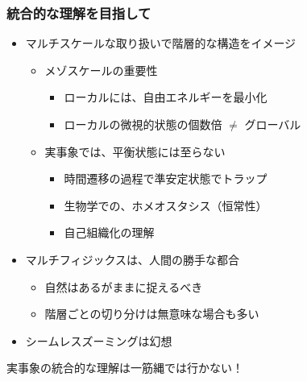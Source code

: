 \documentclass[12pt, dvipdfmx]{beamer}
\begin{document}
\begin{frame}
    \frametitle{統合的な理解を目指して}
    \begin{itemize}
        \item マルチスケールな取り扱いで階層的な構造をイメージ
        \begin{itemize}
            \item メゾスケールの重要性
            \begin{itemize}
                \item ローカルには、自由エネルギーを最小化
                \item ローカルの微視的状態の個数倍 $\neq$ グローバル
            \end{itemize}
            \item 実事象では、平衡状態には至らない
            \begin{itemize}
                \item 時間遷移の過程で準安定状態でトラップ
                \item 生物学での、ホメオスタシス（恒常性）
                \item 自己組織化の理解
            \end{itemize}
        \end{itemize}
        \item マルチフィジックスは、人間の勝手な都合
        \begin{itemize}
            \item 自然はあるがままに捉えるべき
            \item 階層ごとの切り分けは無意味な場合も多い
        \end{itemize}
        \item シームレスズーミングは幻想
    \end{itemize}
    \large{\alert{実事象の統合的な理解は一筋縄では行かない！}}
\end{frame}
\end{document}
